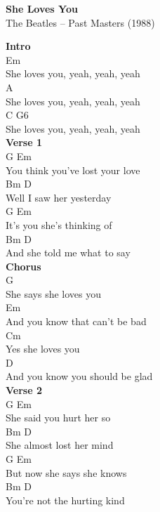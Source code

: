\documentclass[a4paper]{article}
\begin{document}
    \begin{center}
        \textbf{She Loves You}
        ~\\
        The Beatles -- Past Masters (1988)
    \end{center}
    {
        \scriptsize
        \textbf{Intro}
        ~\\
        {
            \cutive
            \obeyspaces
  Em
\\
She loves you, yeah, yeah, yeah
\\
      A
\\
She loves you, yeah, yeah, yeah
\\
      C                     G6
\\
She loves you, yeah, yeah, yeah
\\

        }
        \textbf{Verse 1}
        ~\\
        {
            \cutive
            \obeyspaces
      G                     Em
\\
You think you've lost your love
\\
       Bm             D
\\
Well I saw her yesterday
\\
      G                 Em
\\
It's you she's thinking of
\\
         Bm              D
\\
And she told me what to say
\\

        }
        \textbf{Chorus}
        ~\\
        {
            \cutive
            \obeyspaces
  G                   
\\
She says she loves you
\\
                           Em    
\\
And you know that can't be bad
\\
         Cm
\\
Yes she loves you
\\
                            D
\\
And you know you should be glad
\\

        }
        \textbf{Verse 2}
        ~\\
        {
            \cutive
            \obeyspaces
      G                     Em
\\
She said you hurt her so
\\
       Bm             D
\\
She almost lost her mind
\\
      G                 Em
\\
But now she says she knows
\\
         Bm              D
\\
You're not the hurting kind
\\

}}
\end{document}
